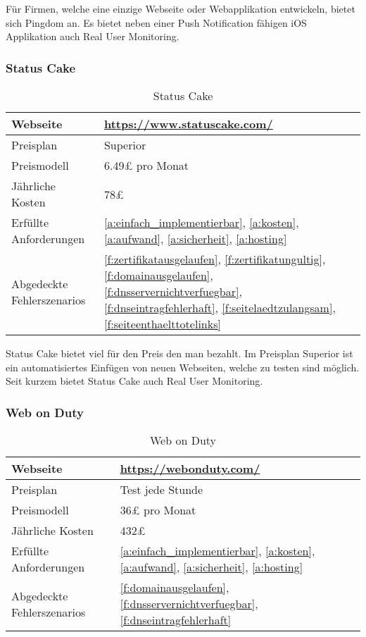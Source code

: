 Für Firmen, welche eine einzige Webseite oder Webapplikation entwickeln, bietet sich Pingdom an. Es bietet neben einer Push Notification fähigen iOS Applikation auch Real User Monitoring.

\subsubsection{Status Cake}
\label{ssub:status_cake}

\begin{table}[H]
  \centering
  \begin{tabular}{p{5cm} p{7cm}}
  \toprule
    Webseite & \url{https://www.statuscake.com/}\\
  \hline
    Preisplan & Superior\\
  \hline
    Preismodell & 6.49£ pro Monat\\
  \hline
    Jährliche Kosten & 78£\\
  \hline
    Erfüllte Anforderungen & \ref{a:einfach_implementierbar}, \ref{a:kosten}, \ref{a:aufwand}, \ref{a:sicherheit}, \ref{a:hosting}\\
  \hline
    Abgedeckte Fehlerszenarios & \ref{f:zertifikatausgelaufen}, \ref{f:zertifikatungultig}, \ref{f:domainausgelaufen}, \ref{f:dnsservernichtverfuegbar}, \ref{f:dnseintragfehlerhaft}, \ref{f:seitelaedtzulangsam}, \ref{f:seiteenthaelttotelinks}\\
  \bottomrule
  \end{tabular}
  \caption{Status Cake}
  \label{tab:status_cake}
\end{table}

Status Cake bietet viel für den Preis den man bezahlt. Im Preisplan Superior ist ein automatisiertes Einfügen von neuen Webseiten, welche zu testen sind möglich. Seit kurzem bietet Status Cake auch Real User Monitoring.

\subsubsection{Web on Duty}
\label{ssub:web_on_duty}

\begin{table}[H]
  \centering
  \begin{tabular}{p{5cm} p{7cm}}
  \toprule
    Webseite & \url{https://webonduty.com/}\\
  \hline
    Preisplan & Test jede Stunde\\
  \hline
    Preismodell & 36£ pro Monat\\
  \hline
    Jährliche Kosten & 432£\\
  \hline
    Erfüllte Anforderungen & \ref{a:einfach_implementierbar}, \ref{a:kosten}, \ref{a:aufwand}, \ref{a:sicherheit}, \ref{a:hosting}\\
  \hline
    Abgedeckte Fehlerszenarios & \ref{f:domainausgelaufen}, \ref{f:dnsservernichtverfuegbar}, \ref{f:dnseintragfehlerhaft}\\
  \bottomrule
  \end{tabular}
  \caption{Web on Duty}
  \label{tab:web_on_duty}
\end{table}

